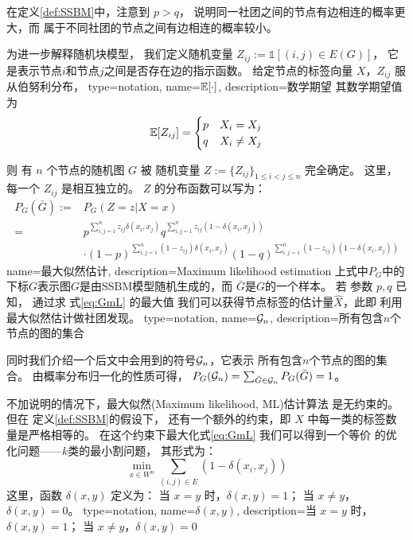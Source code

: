 在定义\ref{def:SSBM}中，注意到 $p>q$，
说明同一社团之间的节点有边相连的概率更大，而
属于不同社团的节点之间有边相连的概率较小。

为进一步解释随机块模型，
我们定义随机变量 $Z_{ij}:=\mathds{1} [(i,j) \in E(G)]$，
它是表示节点$i$和节点$j$之间是否存在边的指示函数。
给定节点的标签向量 $X$，$Z_{ij}$ 服从伯努利分布，
{
  type=notation,
  name={$\operatorname{\mathbb{E}}[\cdot]$},
  description={数学期望}
}
其数学期望值为
\begin{equation}
\operatorname{\mathbb{E}}[Z_{ij}] =
\begin{cases}
p & X_i = X_j \\ 
q & X_i \neq X_j
\end{cases}
\end{equation}

则 有 $n$ 个节点的随机图 $G$ 
被 
随机变量 $Z:=\{Z_{ij}\}_{1\leq i<j\leq n}$ 完全确定。
这里，每一个 $Z_{ij}$ 是相互独立的。
$Z$ 的分布函数可以写为：
\begin{align}\label{eq:mle_sibm}
P_G(\bar{G}):=& P_G(Z = z| X=x) \\
=& p^{\sum_{i,j=1}^n
z_{ij}\delta(x_i, x_j)}q^{\sum_{i,j=1}^n z_{ij}(1-\delta(x_i, x_j))} \\
\quad& \cdot (1-p)^{\sum_{i,j=1}^n (1-z_{ij})\delta(x_i, x_j)}
(1-q)^{\sum_{i,j=1}^n (1-z_{ij})(1-\delta(x_i, x_j))}
\label{eq:GmL}
\end{align}
{name=最大似然估计,
description={Maximum likelihood estimation}}
上式中$P_G$中的下标$G$表示图$G$是由SSBM模型随机生成的，而
$\bar{G}$是$G$的一个样本。
若 参数 $p, q$ 已知，
通过求
式\eqref{eq:GmL} 的最大值
我们可以获得节点标签的估计量$\hat{X}$，此即
利用最大似然估计做社团发现。
{
  type=notation,
  name={$\mathcal{G}_n$},
  description={所有包含$n$个节点的图的集合}
}

同时我们介绍一个后文中会用到的符号$\mathcal{G}_n$，它表示
所有包含$n$个节点的图的集合。
由概率分布归一化的性质可得，
$P_G(\mathcal{G}_n) = \sum_{\bar{G}\in \mathcal{G}_n}P_G(\bar{G})=1$。

不加说明的情况下，最大似然(Maximum likelihood, ML)估计算法 是无约束的。但在
定义\ref{def:SSBM}的假设下，
还有一个额外的约束，即 $X$ 中每一类的标签数量是严格相等的。
在这个约束下最大化式\eqref{eq:GmL} 我们可以得到一个等价
的优化问题——$k$类的最小割问题，
其形式为：
\begin{equation}\label{eq:minimum_k_cut}
  \min_{x\in W^n} \sum_{ (i,j) \in E} (1-\delta(x_i, x_j))
\end{equation}
这里，函数 $\delta(x,y)$ 定义为：
当 $x=y$ 时，$\delta(x,y) = 1$； 当 $x\neq y$，$\delta(x,y)=0$。
{
  type=notation,
  name={$\delta(x,y)$},
  description={当 $x=y$ 时，$\delta(x,y) = 1$； 当 $x\neq y$，$\delta(x,y)=0$}
}

